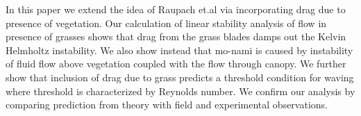 \documentclass[aps,twocolumn,floatfix,prl,10pt]{revtex4-1}
\begin{document}
\newline 
 In this paper we extend the idea of Raupach et.al via incorporating drag due to presence of vegetation. Our calculation of linear stability analysis of flow in presence of grasses 
shows that drag from the grass blades damps out the Kelvin Helmholtz instability. We also show instead that mo-nami is caused by instability 
of fluid flow above vegetation coupled with the flow through canopy. We further show that inclusion of drag due to grass predicts a threshold condition for waving where threshold is
characterized by Reynolds number. We confirm our analysis by comparing prediction from theory with field and experimental observations.  
\end{document}
